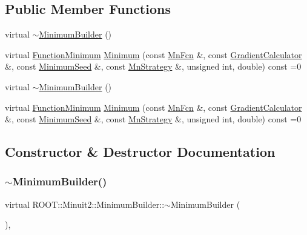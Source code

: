 \subsection*{Public Member Functions}
\begin{DoxyCompactItemize}
\item 
virtual \mbox{\hyperlink{classROOT_1_1Minuit2_1_1MinimumBuilder_acb3f2fd5c8483b62c44e042742ca3d88}{$\sim$\+Minimum\+Builder}} ()
\item 
virtual \mbox{\hyperlink{classROOT_1_1Minuit2_1_1FunctionMinimum}{Function\+Minimum}} \mbox{\hyperlink{classROOT_1_1Minuit2_1_1MinimumBuilder_aefaa624436afa8195af1f3393a35981f}{Minimum}} (const \mbox{\hyperlink{classROOT_1_1Minuit2_1_1MnFcn}{Mn\+Fcn}} \&, const \mbox{\hyperlink{classROOT_1_1Minuit2_1_1GradientCalculator}{Gradient\+Calculator}} \&, const \mbox{\hyperlink{classROOT_1_1Minuit2_1_1MinimumSeed}{Minimum\+Seed}} \&, const \mbox{\hyperlink{classROOT_1_1Minuit2_1_1MnStrategy}{Mn\+Strategy}} \&, unsigned int, double) const =0
\item 
virtual \mbox{\hyperlink{classROOT_1_1Minuit2_1_1MinimumBuilder_acb3f2fd5c8483b62c44e042742ca3d88}{$\sim$\+Minimum\+Builder}} ()
\item 
virtual \mbox{\hyperlink{classROOT_1_1Minuit2_1_1FunctionMinimum}{Function\+Minimum}} \mbox{\hyperlink{classROOT_1_1Minuit2_1_1MinimumBuilder_aefaa624436afa8195af1f3393a35981f}{Minimum}} (const \mbox{\hyperlink{classROOT_1_1Minuit2_1_1MnFcn}{Mn\+Fcn}} \&, const \mbox{\hyperlink{classROOT_1_1Minuit2_1_1GradientCalculator}{Gradient\+Calculator}} \&, const \mbox{\hyperlink{classROOT_1_1Minuit2_1_1MinimumSeed}{Minimum\+Seed}} \&, const \mbox{\hyperlink{classROOT_1_1Minuit2_1_1MnStrategy}{Mn\+Strategy}} \&, unsigned int, double) const =0
\end{DoxyCompactItemize}


\subsection{Constructor \& Destructor Documentation}
\mbox{\label{classROOT_1_1Minuit2_1_1MinimumBuilder_acb3f2fd5c8483b62c44e042742ca3d88}} 
\subsubsection{\texorpdfstring{$\sim$MinimumBuilder()}{~MinimumBuilder()}\hspace{0.1cm}{\footnotesize\ttfamily [1/2]}}
{\footnotesize\ttfamily virtual R\+O\+O\+T\+::\+Minuit2\+::\+Minimum\+Builder\+::$\sim$\+Minimum\+Builder (\begin{DoxyParamCaption}{ }\end{DoxyParamCaption})\hspace{0.3cm}{\ttfamily [inline]}, {\ttfamily [virtual]}}

